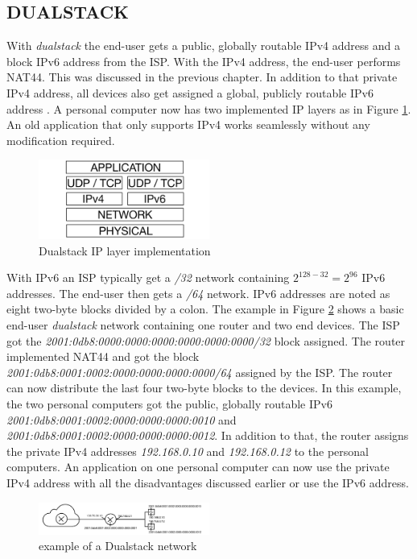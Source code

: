 \documentclass[format=sigconf, natbib=true, nonacm=true]{acmart}
\begin{document}
    \subsection{DUALSTACK}
    With \textit{dualstack} the end-user gets a public, globally routable IPv4 address and a block IPv6 address from the ISP. With the IPv4 address, the end-user performs NAT44. This was discussed in the previous chapter. In addition to that private IPv4 address, all devices also get assigned a global, publicly routable IPv6 address \cite{8716482}. A personal computer now has two implemented IP layers as in Figure \ref{fig:dualstack}. An old application that only supports IPv4 works seamlessly without any modification required.
    \begin{figure}
        \centering
        \includegraphics[width=0.5\textwidth]{images/dualstack.png}
        \caption{Dualstack IP layer implementation}
        \label{fig:dualstack}
    \end{figure}
    With IPv6 an ISP typically get a \textit{/32} network containing $2^{128-32}=2^{96}$ IPv6 addresses. The end-user then gets a \textit{/64} network. IPv6 addresses are noted as eight two-byte blocks divided by a colon. The example in Figure \ref{fig:dualstack_network} shows a basic end-user \textit{dualstack} network containing one router and two end devices. The ISP got the \textit{2001:0db8:0000:0000:0000:0000:0000:0000/32} block assigned. The router implemented NAT44 and got the block \textit{2001:0db8:0001:0002:0000:0000:0000:0000/64} assigned by the ISP. The router can now distribute the last four two-byte blocks to the devices. In this example, the two personal computers got the public, globally routable IPv6 \textit{2001:0db8:0001:0002:0000:0000:0000:0010} and \textit{2001:0db8:0001:0002:0000:0000:0000:0012}. In addition to that, the router assigns the private IPv4 addresses \textit{192.168.0.10} and \textit{192.168.0.12} to the personal computers. An application on one personal computer can now use the private IPv4 address with all the disadvantages discussed earlier or use the IPv6 address.
    \begin{figure}
        \centering
        \includegraphics[width=0.5\textwidth]{images/dualstack_network.png}
        \caption{example of a Dualstack network}
        \label{fig:dualstack_network}
    \end{figure}
\end{document}
